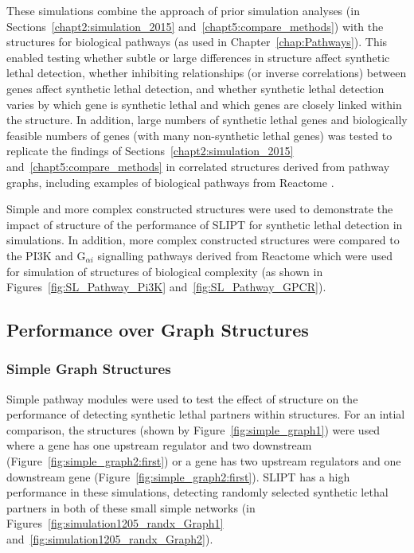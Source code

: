 These simulations combine the approach of prior simulation analyses (in Sections~\ref{chapt2:simulation_2015} and~\ref{chapt5:compare_methods}) with the  structures for biological pathways (as used in Chapter~\ref{chap:Pathways}). This enabled testing whether subtle or large differences in  structure affect \gls{synthetic lethal} detection, whether inhibiting relationships (or inverse correlations) between genes affect \gls{synthetic lethal} detection, and whether \gls{synthetic lethal} detection varies by which gene is \gls{synthetic lethal} and which genes are closely linked within the  structure. In addition, large numbers of \gls{synthetic lethal} genes and biologically feasible numbers of genes (with many non-synthetic lethal genes) was tested to replicate the findings of Sections~\ref{chapt2:simulation_2015} and~\ref{chapt5:compare_methods} in correlated structures derived from pathway graphs, including examples of biological pathways from Reactome \citep{Reactome}.

Simple and more complex constructed  structures were used to demonstrate the impact of  structure of the performance of \gls{SLIPT} for \gls{synthetic lethal} detection in simulations. In addition, more complex constructed  structures were compared to the \gls{PI3K} and G$_{\alpha i}$ signalling pathways derived from Reactome which were used for simulation of  structures of biological complexity (as shown in Figures~\ref{fig:SL_Pathway_Pi3K} and~\ref{fig:SL_Pathway_GPCR}).

\FloatBarrier

\subsection{Performance over Graph Structures}
\label{chapt5:graphsim_performance}

\subsubsection{Simple Graph Structures}
\label{chapt5:graphsim_performance_simple}

\FloatBarrier

Simple pathway modules were used to test the effect of  structure on the performance of detecting \gls{synthetic lethal} partners within  structures. For an intial comparison, the  structures (shown by Figure~\ref{fig:simple_graph1}) were used where a gene has one upstream regulator and two downstream (Figure~\ref{fig:simple_graph2:first}) or a gene has two upstream regulators and one downstream gene (Figure~\ref{fig:simple_graph2:first}). \gls{SLIPT} has a high performance in these simulations, detecting randomly selected \gls{synthetic lethal} partners in both of these small simple networks (in Figures~\ref{fig:simulation1205_randx_Graph1} and~\ref{fig:simulation1205_randx_Graph2}). 

